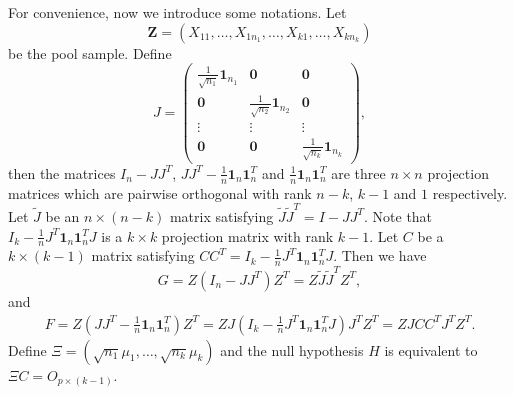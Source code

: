 \documentclass[review]{elsarticle}
\newcommand{\bZ}{\mathbf{Z}}
\theoremstyle{plain}
\theoremstyle{definition}
\theoremstyle{remark}
\begin{document}
 For convenience, now we introduce some notations.
 Let
 $$\bZ=(X_{11},\ldots,X_{1n_1},\ldots,X_{k1},\ldots,X_{kn_k})$$
 be the pool sample.
 Define
 $$
 J=\begin{pmatrix}
     \frac{1}{\sqrt{n_1}}\mathbf{1}_{n_1}&\mathbf{0} & \mathbf{0}\\
     \mathbf{0}&\frac{1}{\sqrt{n_2}} \mathbf{1}_{n_2}& \mathbf{0}\\
     \vdots &\vdots &\vdots \\
     \mathbf{0}&\mathbf{0}&\frac{1}{\sqrt{n_k}}\mathbf{1}_{n_k}
 \end{pmatrix},
 $$
then the matrices $I_n-JJ^T$, $JJ^T-\frac{1}{n}\mathbf{1}_n\mathbf{1}_n^T$ and $\frac{1}{n}\mathbf{1}_n\mathbf{1}_n^T$ are three $n\times n$ projection matrices which are pairwise orthogonal with rank $n-k$, $k-1$ and $1$ respectively.
Let $\tilde{J}$ be an $n\times (n-k)$ matrix satisfying $\tilde{J}\tilde{J}^T =I-JJ^T$.
Note that $I_k-\frac{1}{n}J^T\mathbf{1}_n \mathbf{1}_n^T J$ is a $k\times k$ projection matrix with rank $k-1$.
Let $C$ be a $k\times (k-1)$ matrix satisfying $CC^T=I_k-\frac{1}{n}J^T\mathbf{1}_n \mathbf{1}_n^T J$.
Then we have
$$
G=Z(I_n-JJ^T)Z^T=
Z\tilde{J}\tilde{J}^T Z^T,
$$
and
\begin{equation*}
    \begin{aligned}
        F=Z(JJ^T-\frac{1}{n}\mathbf{1}_n\mathbf{1}_n^T)Z^T
=ZJ(I_k-\frac{1}{n}J^T\mathbf{1}_n \mathbf{1}_n^T J)J^T Z^T
=ZJC C^T J^T Z^T.
    \end{aligned}
\end{equation*}
 Define $\Xi=(\sqrt{n_1}\mu_1,\ldots,\sqrt{n_k}\mu_k)$
 and the null hypothesis $H$ is equivalent to $\Xi C=O_{p\times (k-1)}$.
\end{document}
